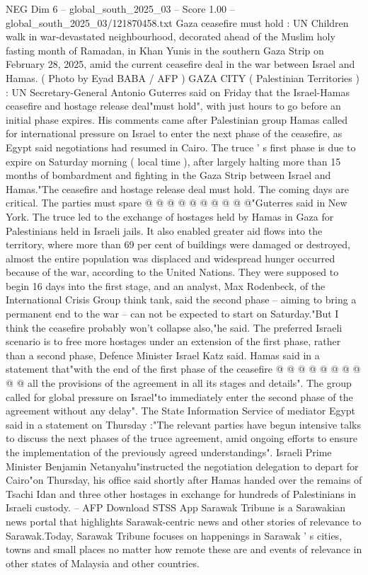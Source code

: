 \begin{textsample}{NEG Dim 6 – global\_south\_2025\_03 – Score 1.00 – global\_south\_2025\_03/121870458.txt}  \label{ex:f6_neg_217}
Gaza ceasefire must hold : UN Children walk in war-devastated neighbourhood, decorated ahead of the Muslim holy fasting month of Ramadan, in Khan Yunis in the southern Gaza Strip on February 28, 2025, amid the current ceasefire deal in the war between Israel and Hamas. ( Photo by Eyad BABA / AFP ) GAZA CITY ( Palestinian Territories ) : UN Secretary-General Antonio Guterres said on Friday that the Israel-Hamas ceasefire and hostage release deal"must hold", with just hours to go before an initial phase expires.
His comments came after Palestinian group Hamas called for international pressure on Israel to enter the next phase of the ceasefire, as Egypt said negotiations had resumed in Cairo.
The truce ' s first phase is due to expire on Saturday morning ( local time ), after largely halting more than 15 months of bombardment and fighting in the Gaza Strip between Israel and Hamas."The ceasefire and hostage release deal must hold.
The coming days are critical.
The parties must spare @ @ @ @ @ @ @ @ @ @"Guterres said in New York.
The truce led to the exchange of hostages held by Hamas in Gaza for Palestinians held in Israeli jails.
It also enabled greater aid flows into the territory, where more than 69 per cent of buildings were damaged or destroyed, almost the entire population was displaced and widespread hunger occurred because of the war, according to the United Nations.
They were supposed to begin 16 days into the first stage, and an analyst, Max Rodenbeck, of the International Crisis Group think tank, said the second phase -- aiming to bring a permanent end to the war -- can not be expected to start on Saturday."But I think the ceasefire probably won't collapse also,"he said.
The preferred Israeli scenario is to free more hostages under an extension of the first phase, rather than a second phase, Defence Minister Israel Katz said.
Hamas said in a statement that"with the end of the first phase of the ceasefire @ @ @ @ @ @ @ @ @ @ all the provisions of the agreement in all its stages and details".
The group called for global pressure on Israel"to immediately enter the second phase of the agreement without any delay".
The State Information Service of mediator Egypt said in a statement on Thursday :"The relevant parties have begun intensive talks to discuss the next phases of the truce agreement, amid ongoing efforts to ensure the implementation of the previously agreed understandings".
Israeli Prime Minister Benjamin Netanyahu"instructed the negotiation delegation to depart for Cairo"on Thursday, his office said shortly after Hamas handed over the remains of Tsachi Idan and three other hostages in exchange for hundreds of Palestinians in Israeli custody. -- AFP Download STSS App Sarawak Tribune is a Sarawakian news portal that highlights Sarawak-centric news and other stories of relevance to Sarawak.Today, Sarawak Tribune focuses on happenings in Sarawak ' s cities, towns and small places no matter how remote these are and events of relevance in other states of Malaysia and other countries.

\end{textsample}
